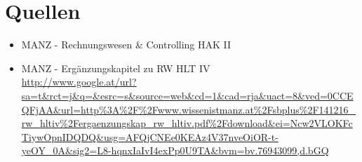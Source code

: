 \documentclass[a4paper,10pt]{report}
\begin{document}
\section{Quellen}
\begin{itemize}
  \item MANZ - Rechnungswesen \& Controlling HAK II
  \item { MANZ - Ergänzungskapitel zu RW HLT IV\\ \url{http://www.google.at/url?sa=t&rct=j&q=&esrc=s&source=web&cd=1&cad=rja&uact=8&ved=0CCEQFjAA&url=http%3A%2F%2Fwww.wissenistmanz.at%2Fsbplus%2F141216_rw_hltiv%2Fergaenzungskap_rw_hltiv.pdf%2Fdownload&ei=Ncw2VLOKFcTiywOpnIDQDQ&usg=AFQjCNEe0KEAz4V37nveOiOR-t-yeOY_0A&sig2=L8-hqnxIaIvI4exPp0U9TA&bvm=bv.76943099,d.bGQ}
}
\end{itemize}
\end{document}
